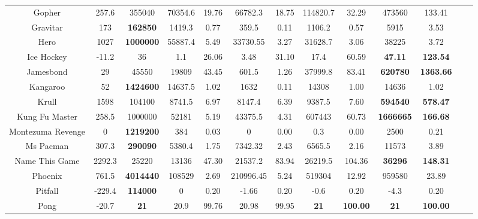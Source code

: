 \documentclass[nohyperref]{article}
\theoremstyle{plain}
\begin{document}
\begin{table}[!hb]
\begin{center}
\begin{tabular}{|c| c| c| c c| c c| c c| c c| c c|}
 Gopher             & 257.6     & 355040    & 70354.6  &19.76   & 66782.3    & 18.75      & 114820.7& 32.29      &473560           &133.41 \\
 Gravitar           & 173       & \textbf{162850}    & 1419.3   &0.77    & 359.5      & 0.11       & 1106.2  & 0.57               &5915             &3.53\\
 Hero               & 1027      & \textbf{1000000}   & 55887.4  &5.49    & 33730.55   & 3.27       & 31628.7 & 3.06               &38225            &3.72  \\
 Ice Hockey         & -11.2     & 36        & 1.1      &26.06   & 3.48       & 31.10      & 17.4    & 60.59          &\textbf{47.11}           &\textbf{123.54} \\
 Jamesbond          & 29        & 45550     & 19809    &43.45   & 601.5      & 1.26       & 37999.8 & 83.41     &\textbf{620780}          &\textbf{1363.66}\\
 Kangaroo           & 52        & \textbf{1424600}   & 14637.5  &1.02    & 1632       & 0.11       & 14308   & 1.00              &14636           &1.02  \\
 Krull              & 1598      & 104100    & 8741.5   &6.97    & 8147.4     & 6.39       & 9387.5  & 7.60               &\textbf{594540}          &\textbf{578.47}\\
 Kung Fu Master     & 258.5     & 1000000   & 52181    &5.19    & 43375.5    & 4.31       & 607443  & 60.73             &\textbf{1666665}          &\textbf{166.68}\\
 Montezuma Revenge  &0          & \textbf{1219200}   & 384      &0.03    & 0          & 0.00       & 0.3     & 0.00              &2500            &0.21\\
 Ms Pacman          & 307.3     & \textbf{290090}    & 5380.4   &1.75    & 7342.32    & 2.43       & 6565.5  & 2.16           &11573           &3.89\\
 Name This Game     & 2292.3    & 25220     & 13136    &47.30   & 21537.2    & 83.94      & 26219.5 & 104.36      &\textbf{36296}  &\textbf{148.31}    \\
 Phoenix            & 761.5     & \textbf{4014440}   & 108529   &2.69    & 210996.45  & 5.24       & 519304  & 12.92            &959580          &23.89\\
 Pitfall            & -229.4    & \textbf{114000}    & 0        &0.20    & -1.66      & 0.20       & -0.6    & 0.20                &-4.3            &0.20\\
 Pong               & -20.7     & \textbf{21}        & 20.9     &99.76   & 20.98      & 99.95      & \textbf{21}      & \textbf{100.00}    &\textbf{21}     &\textbf{100.00}    \\

\end{tabular}
\end{center}
\end{table}
\end{document}
